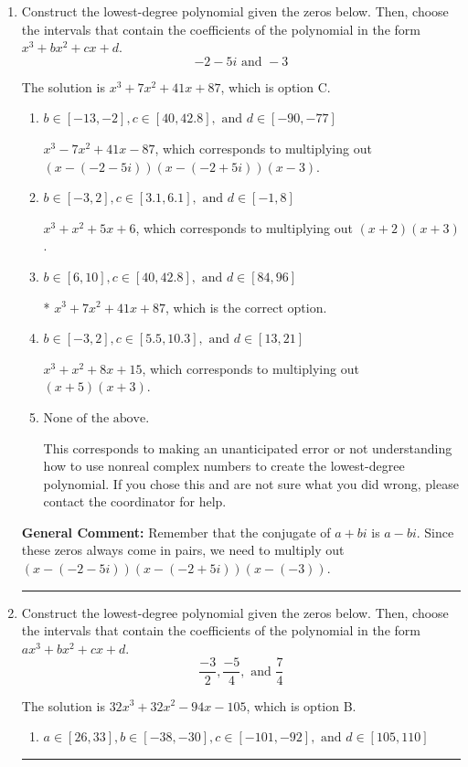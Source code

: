 \documentclass{extbook}[14pt]
\newcommand{\litem}[1]{\item #1

\rule{\textwidth}{0.4pt}}
\begin{document}
\begin{enumerate}\litem{
Construct the lowest-degree polynomial given the zeros below. Then, choose the intervals that contain the coefficients of the polynomial in the form $x^3+bx^2+cx+d$.
\[ -2 - 5 i \text{ and } -3 \]

The solution is \( x^{3} +7 x^{2} +41 x + 87 \), which is option C.\begin{enumerate}[label=\Alph*.]
\item \( b \in [-13, -2], c \in [40, 42.8], \text{ and } d \in [-90, -77] \)

$x^{3} -7 x^{2} +41 x -87$, which corresponds to multiplying out $(x-(-2 - 5 i))(x-(-2 + 5 i))(x -3)$.
\item \( b \in [-3, 2], c \in [3.1, 6.1], \text{ and } d \in [-1, 8] \)

$x^{3} + x^{2} +5 x + 6$, which corresponds to multiplying out $(x + 2)(x + 3)$.
\item \( b \in [6, 10], c \in [40, 42.8], \text{ and } d \in [84, 96] \)

* $x^{3} +7 x^{2} +41 x + 87$, which is the correct option.
\item \( b \in [-3, 2], c \in [5.5, 10.3], \text{ and } d \in [13, 21] \)

$x^{3} + x^{2} +8 x + 15$, which corresponds to multiplying out $(x + 5)(x + 3)$.
\item \( \text{None of the above.} \)

This corresponds to making an unanticipated error or not understanding how to use nonreal complex numbers to create the lowest-degree polynomial. If you chose this and are not sure what you did wrong, please contact the coordinator for help.
\end{enumerate}

\textbf{General Comment:} Remember that the conjugate of $a+bi$ is $a-bi$. Since these zeros always come in pairs, we need to multiply out $(x-(-2 - 5 i))(x-(-2 + 5 i))(x-(-3))$.
}
\litem{
Construct the lowest-degree polynomial given the zeros below. Then, choose the intervals that contain the coefficients of the polynomial in the form $ax^3+bx^2+cx+d$.
\[ \frac{-3}{2}, \frac{-5}{4}, \text{ and } \frac{7}{4} \]

The solution is \( 32x^{3} +32 x^{2} -94 x -105 \), which is option B.\begin{enumerate}[label=\Alph*.]
\item \( a \in [26, 33], b \in [-38, -30], c \in [-101, -92], \text{ and } d \in [105, 110] \)


\end{enumerate}}
\end{enumerate}
\end{document}
